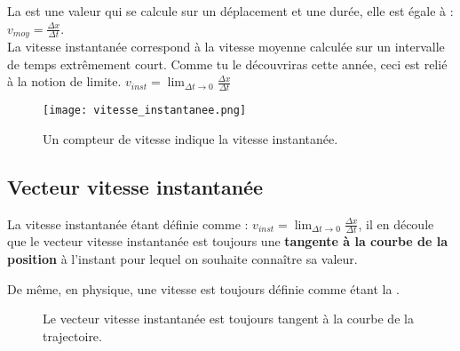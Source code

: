 La  est une valeur qui se calcule sur un déplacement et une durée, elle est égale à :
\(v_{moy}=  \frac{\Delta x}{\Delta t}\).\\

La vitesse instantanée correspond à la vitesse moyenne calculée sur un intervalle de temps extrêmement court. Comme tu le découvriras cette année, ceci est relié à la notion de limite.
\(v_{inst}= \lim_{\Delta t \to 0}  \frac{\Delta x}{\Delta t}\)

\begin{figure}[h!]
    \centering
    \texttt{[image: vitesse\_instantanee.png]}
    \caption{Un compteur de vitesse indique la vitesse instantanée.}
    \label{vitesse_instantanee}
\end{figure}

\newpage

\subsection{Vecteur vitesse instantanée}
La vitesse instantanée étant définie comme : \(v_{inst}= \lim_{\Delta t \to 0}  \frac{\Delta x}{\Delta t}\), il en découle que le vecteur vitesse instantanée est toujours une \textbf{tangente à la courbe de la position} à l'instant pour lequel on souhaite connaître sa valeur.

\begin{encadre}
    De même, en physique, une vitesse est toujours définie comme étant la .
\end{encadre}

\begin{figure}[h!]
    \centering
    \resizebox{0.8\linewidth}{!}{}
    \caption{Le vecteur vitesse instantanée est toujours tangent à la courbe de la trajectoire.}
    \label{vecteur_vitesse_instantanee}
\end{figure}
\newpage

